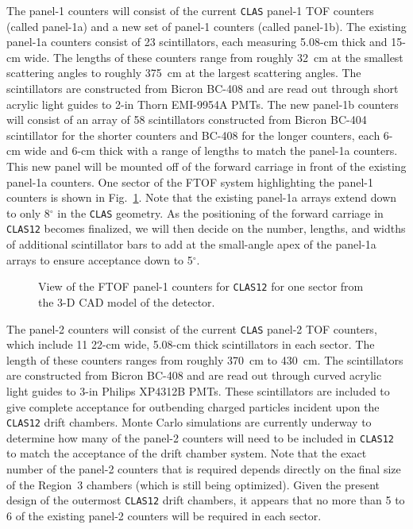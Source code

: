 The panel-1 counters will consist of the current {\tt CLAS} panel-1 TOF 
counters (called panel-1a) and a new set of panel-1 counters (called 
panel-1b).  The existing panel-1a counters consist of 23 scintillators, each 
measuring 5.08-cm thick and 15-cm wide.  The lengths of these counters 
range from roughly 32~cm at the smallest scattering angles to roughly 
375~cm at the largest scattering angles.  The scintillators are constructed 
from Bicron BC-408 and are read out through short acrylic light guides 
to 2-in Thorn EMI-9954A PMTs.  The new panel-1b counters will consist of an 
array of 58 scintillators constructed from Bicron BC-404 scintillator for
the shorter counters and BC-408 for the longer counters, each 6-cm wide and 
6-cm thick with a range of lengths to match the panel-1a counters.  This new 
panel will be mounted off of the forward carriage in front of the existing 
panel-1a counters.  One sector of the FTOF system highlighting the panel-1 
counters is shown in Fig.~\ref{ftof_pic}.  Note that the existing panel-1a
arrays extend down to only 8$^\circ$ in the {\tt CLAS} geometry.  As the
positioning of the forward carriage in {\tt CLAS12} becomes finalized, we
will then decide on the number, lengths, and widths of additional scintillator
bars to add at the small-angle apex of the panel-1a arrays to ensure
acceptance down to 5$^\circ$.

\begin{figure}[htbp]
\vspace{8.8cm}
\caption{\small{View of the FTOF panel-1 counters for {\tt CLAS12} for one
sector from the 3-D CAD model of the detector.}}
\label{ftof_pic}
\end{figure}

The panel-2 counters will consist of the current {\tt CLAS} panel-2 TOF 
counters, which include 11 22-cm wide, 5.08-cm thick scintillators in each 
sector.  The length of these counters ranges from roughly 370~cm to 
430~cm.  The scintillators are constructed from Bicron BC-408 and are 
read out through curved acrylic light guides to 3-in Philips XP4312B PMTs. 
These scintillators are included to give complete acceptance for 
outbending charged particles incident upon the {\tt CLAS12} drift chambers.  
Monte Carlo simulations are currently underway to determine how many of the
panel-2 counters will need to be included in {\tt CLAS12} to match the
acceptance of the drift chamber system.  Note that the exact number of
the panel-2 counters that is required depends directly on the final size 
of the Region~3 chambers (which is still being optimized).  Given the
present design of the outermost {\tt CLAS12} drift chambers, it appears that
no more than 5 to 6 of the existing panel-2 counters will be required in each
sector.


